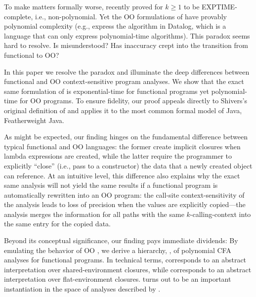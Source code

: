To make matters formally worse,
\citet{dvanhorn:VanHorn-Mairson:ICFP08} recently proved \kCFA{} for $k
\geq 1$ to be EXPTIME-complete, i.e., non-polynomial.
Yet the OO formulations of \kCFA{} have provably polynomial complexity
(e.g., \citet{BS-OOPSLA09} express the algorithm in Datalog, which is
a language that can only express polynomial-time algorithms). This
paradox seems hard to resolve. Is \kCFA{} misunderstood?  Has 
inaccuracy crept into the transition from functional to OO?

In this paper we resolve the paradox and illuminate the deep
differences between functional and OO context-sensitive program
analyses. We show that the exact same formulation of \kCFA{} is
exponential-time for functional programs yet polynomial-time for OO
programs. To ensure fidelity, our proof appeals directly to Shivers's
original definition of \kCFA{} and applies it to the most common
formal model of Java, Featherweight Java.

As might be expected, our finding hinges on the fundamental
difference between typical functional and OO languages: the former
create implicit closures when lambda expressions are created, while
the latter require the programmer to explicitly ``close'' (i.e., pass
to a constructor) the data that a newly created object can reference.
At an intuitive level, this difference also explains why the exact
same \kCFA{} analysis will not yield the same results if a functional
program is automatically rewritten into an OO program: the call-site
context-sensitivity of the analysis leads to loss of precision when
the values are explicitly copied---the analysis merges the information
for all paths with the same $k$-calling-context into the same entry
for the copied data.

Beyond its conceptual significance, our finding pays immediate
dividends: By emulating the behavior of OO \kCFA{}, we
derive a hierarchy, \nCFA{}, of polynomial CFA analyses for functional
programs. In technical terms, \kCFA{} corresponds to an abstract
interpretation over shared-environment closures, while \nCFA{} 
corresponds to an abstract interpretation over flat-environment
closures.  
\nCFA{} turns out to be an important instantiation in the space of
analyses described by
\citet{mattmight:Jagannathan:1995:Unified}.


























